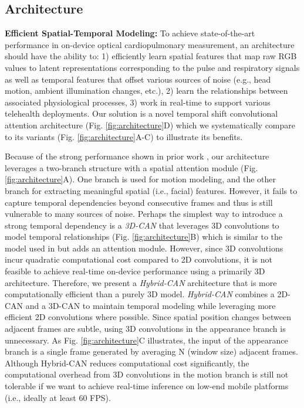 \documentclass{article}
\begin{document}
\label{sec: optical_model}
\subsection{Architecture}
\textbf{Efficient Spatial-Temporal Modeling:}
To achieve state-of-the-art performance in on-device optical cardiopulmonary measurement, an architecture should have the ability to: 1) efficiently learn spatial features that map raw RGB values to latent representations corresponding to the pulse and respiratory signals as well as temporal features that offset various sources of noise (e.g., head motion, ambient illumination changes, etc.), 2) learn the relationships between associated physiological processes, 3) work in real-time to support various telehealth deployments. Our solution is a novel temporal shift convolutional attention architecture (Fig. \ref{fig:architecture}D) which we systematically compare to its variants (Fig. \ref{fig:architecture}A-C) to illustrate its benefits.

Because of the strong performance shown in prior work \citep{chen2018deepphys}, our architecture leverages a two-branch structure with a spatial attention module (Fig. \ref{fig:architecture}A). One branch is used for motion modeling, and the other branch for extracting meaningful spatial (i.e., facial) features. However, it fails to capture temporal dependencies beyond consecutive frames and thus is still vulnerable to many sources of noise. Perhaps the simplest way to introduce a strong temporal dependency is a \textit{3D-CAN} that leverages 3D convolutions to model temporal relationships (Fig. \ref{fig:architecture}B) which is similar to the model used in \cite{yu2019remote} but adds an attention module. However, since 3D convolutions incur quadratic computational cost compared to 2D convolutions, it is not feasible to achieve real-time on-device performance using a primarily 3D architecture. Therefore, we present a \textit{Hybrid-CAN} architecture that is more computationally efficient than a purely 3D model. \textit{Hybrid-CAN} combines a 2D-CAN and a 3D-CAN to maintain temporal modeling while leveraging more efficient 2D convolutions where possible. Since spatial position changes between adjacent frames are subtle, using 3D convolutions in the appearance branch is unnecessary. As Fig. \ref{fig:architecture}C illustrates, the input of the appearance branch is a single frame generated by averaging N (window size) adjacent frames. Although Hybrid-CAN reduces computational cost significantly, the computational overhead from 3D convolutions in the motion branch is still not tolerable if we want to achieve real-time inference on low-end mobile platforms (i.e., ideally at least 60 FPS).  
\end{document}
